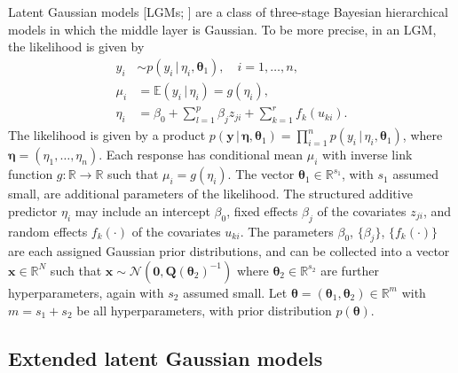 \documentclass[a4paper, nobind]{templates/ociamthesis}
\newcommand{\x}{\mathbf{x}}
\newcommand{\y}{\mathbf{y}}
\newcommand{\btheta}{\bm{\theta}}
\newcommand{\bmeta}{\bm{\eta}}
\begin{document}
Latent Gaussian models {[}LGMs; \textcite{rue2009approximate}{]} are a class of three-stage Bayesian hierarchical models in which the middle layer is Gaussian.
To be more precise, in an LGM, the likelihood is given by
\begin{align*}
y_i &\sim p(y_i \, | \, \eta_i, \btheta_1), \quad i = 1, \ldots, n, \\
\mu_i &= \mathbb{E}(y_i \, | \, \eta_i) = g(\eta_i), \\
\eta_i &= \beta_0 + \sum_{l = 1}^{p} \beta_j z_{ji} + \sum_{k = 1}^{r} f_k(u_{ki}).
\end{align*}
The likelihood is given by a product \(p(\y \, | \, \bmeta, \btheta_1) = \prod_{i = 1}^n p(y_i \, | \, \eta_i, \btheta_1)\), where \(\bmeta = (\eta_1, \ldots, \eta_n)\).
Each response has conditional mean \(\mu_i\) with inverse link function \(g: \mathbb{R} \to \mathbb{R}\) such that \(\mu_i = g(\eta_i)\).
The vector \(\btheta_1 \in \mathbb{R}^{s_1}\), with \(s_1\) assumed small, are additional parameters of the likelihood.
The structured additive predictor \(\eta_i\) may include an intercept \(\beta_0\), fixed effects \(\beta_j\) of the covariates \(z_{ji}\), and random effects \(f_k(\cdot)\) of the covariates \(u_{ki}\).
The parameters \(\beta_0\), \(\{\beta_j\}\), \(\{f_k(\cdot)\}\) are each assigned Gaussian prior distributions, and can be collected into a vector \(\x \in \mathbb{R}^N\) such that \(\x \sim \mathcal{N}(\mathbf{0}, \mathbf{Q}(\btheta_2)^{-1})\) where \(\btheta_2 \in \mathbb{R}^{s_2}\) are further hyperparameters, again with \(s_2\) assumed small.
Let \(\btheta = (\btheta_1, \btheta_2) \in \mathbb{R}^m\) with \(m = s_1 + s_2\) be all hyperparameters, with prior distribution \(p(\btheta)\).

\hypertarget{extended-latent-gaussian-models}{%
\subsection{Extended latent Gaussian models}\label{extended-latent-gaussian-models}}
\end{document}
